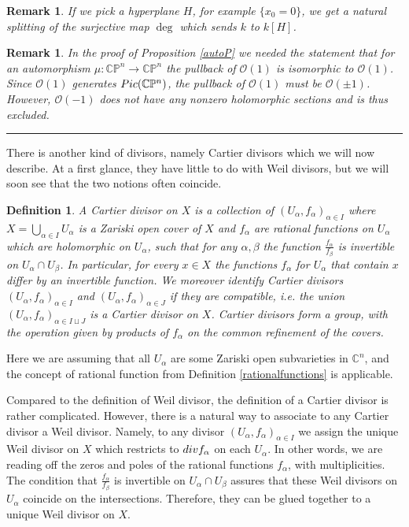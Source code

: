\documentclass[11pt]{article}
\numberwithin{equation}{section}
\numberwithin{footnote}{section}
\newtheorem{defn}[thm]{Definition}
\newtheorem{rem}[thm]{Remark}
\newcommand{\blue}{\color{blue}}
\renewcommand{\P}{{\mathbb P}}
\newcommand{\C}{{\mathbb C}}
\begin{document}
\smallskip
\begin{rem}
If we pick a hyperplane $H$, for example $\{x_0=0\}$, we get a natural splitting of the surjective map $\deg$ which sends $k$ to $k[H]$.
\end{rem}

\smallskip
\begin{rem}\label{O1O1}
In the proof of Proposition \ref{autoP} we needed the statement that for an automorphism $\mu:\C\P^n\to \C\P^n$ the pullback of $\mathcal O(1)$ is isomorphic to $\mathcal O(1)$. Since $\mathcal O(1)$ generates ${\rm Pic}(\C\P^n)$, the 
pullback  of $\mathcal O(1)$ must be  $\mathcal O(\pm 1)$. However,  $\mathcal O(-1)$ does not have any nonzero holomorphic sections and is thus excluded.
\end{rem}

\smallskip
{\blue \hrule}

\smallskip
There is another kind of divisors, namely {\blue Cartier divisors} which we will now describe. At a first glance, they have little to do with Weil divisors, but we will soon see that the two notions often coincide.

\smallskip
\begin{defn}
A Cartier divisor on $X$ is a collection of $(U_\alpha,f_\alpha)_{\alpha\in I}$ where $X = \bigcup_{\alpha\in I} U_\alpha$ is a Zariski open cover of $X$ and $f_\alpha$ are rational functions on $U_\alpha$ which are holomorphic on $U_\alpha$, such that for any $\alpha,\beta$ the function $\frac {f_\alpha }{f_\beta}$ is invertible on $U_\alpha\cap U_\beta$. In particular, for every $x\in X$ the functions $f_\alpha$  for $U_\alpha$ that contain $x$ differ by an invertible function. We moreover identify Cartier divisors $(U_\alpha,f_\alpha)_{\alpha\in I}$ and $(U_\alpha,f_\alpha)_{\alpha\in J}$ if they are compatible, i.e. the union $(U_\alpha,f_\alpha)_{\alpha\in I\sqcup J}$
is a Cartier divisor on $X$. Cartier divisors form a group, with the operation given by products of $f_\alpha$ on the common refinement of the covers.
\end{defn}

Here we are assuming that all $U_\alpha$ are some Zariski open subvarieties in $\C^n$, and the concept of rational function from Definition \ref{rationalfunctions} is applicable.

\smallskip
Compared to the definition of Weil divisor, the definition of a Cartier divisor is rather complicated. 
However, there is a natural way to associate to any Cartier divisor a Weil divisor. Namely, to any divisor $(U_\alpha,f_\alpha)_{\alpha\in I}$ we assign the unique Weil divisor on $X$ which restricts to ${\rm div} f_{\alpha}$ on each $U_\alpha$. In other words, we are reading off the zeros and poles of the rational functions $f_\alpha$, with multiplicities. The condition that $\frac {f_\alpha }{f_\beta}$ is invertible on $U_\alpha\cap U_\beta$ assures that these Weil divisors on $U_\alpha$ coincide on the intersections. Therefore, they can be glued together to a unique Weil divisor on $X$.
\end{document}
